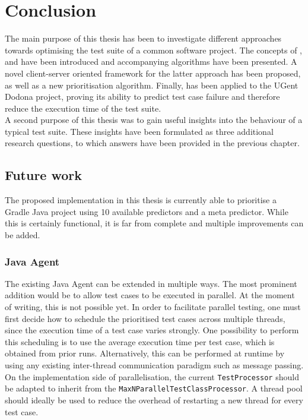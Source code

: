 
\chapter{Conclusion}
\label{ch:conclusion}

The main purpose of this thesis has been to investigate different approaches towards optimising the test suite of a common software project. The concepts of \tsm{}, \tcs{} and \tcp{} have been introduced and accompanying algorithms have been presented. A novel client-server oriented framework for the latter approach has been proposed, as well as a new prioritisation algorithm. Finally, \velocity{} has been applied to the UGent Dodona project, proving its ability to predict test case failure and therefore reduce the execution time of the test suite.\\

\noindent A second purpose of this thesis was to gain useful insights into the behaviour of a typical test suite. These insights have been formulated as three additional research questions, to which answers have been provided in the previous chapter.

\section{Future work}
The proposed \velocity{} implementation in this thesis is currently able to prioritise a Gradle Java project using 10 available predictors and a meta predictor. While this is certainly functional, it is far from complete and multiple improvements can be added.

\subsection{Java Agent}
The existing Java Agent can be extended in multiple ways. The most prominent addition would be to allow test cases to be executed in parallel. At the moment of writing, this is not possible yet. In order to facilitate parallel testing, one must first decide how to schedule the prioritised test cases across multiple threads, since the execution time of a test case varies strongly. One possibility to perform this scheduling is to use the average execution time per test case, which is obtained from prior runs. Alternatively, this can be performed at runtime by using any existing inter-thread communication paradigm such as message passing. On the implementation side of parallelisation, the current \texttt{TestProcessor} should be adapted to inherit from the \texttt{MaxNParallelTestClassProcessor}. A thread pool should ideally be used to reduce the overhead of restarting a new thread for every test case.

